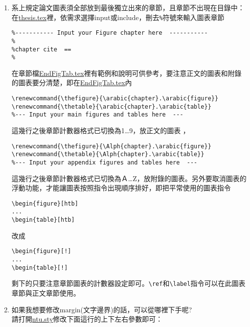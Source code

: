 \begin{enumerate}[leftmargin=0pt, topsep=0pt, itemsep=0pt, label=\Roman{*}.]
\begin{enumerate}[topsep=0pt, itemsep=0pt, label=$\bullet$]
\begin{verbatim}
\chapter{First appendix title}
    \end{verbatim}
    即可，以此類推。    
        \item 系上規定論文圖表須全部放到最後獨立出來的章節，且章節不出現在目錄中：\\
    在\href{run:./thesis.tex}{thesis.tex}裡，依需求選擇input或include，刪去\texttt{\%}符號來輸入圖表章節
    \begin{verbatim}    
%----------- Input your Figure chapter here  -----------
% 
%chapter cite  == 
%
    \end{verbatim}
    在章節檔\href{run:./EndFigTab.tex}{EndFigTab.tex}裡有範例和說明可供參考，要注意正文的圖表和附錄的圖表要分清楚，即在\href{run:./EndFigTab.tex}{EndFigTab.tex}內
    \begin{verbatim}    
\renewcommand{\thefigure}{\arabic{chapter}.\arabic{figure}} 
\renewcommand{\thetable}{\arabic{chapter}.\arabic{table}} 
%--- Input your main figures and tables here  ---
    \end{verbatim}
    這幾行之後章節計數器格式已切換為1\dots 9，放正文的圖表 ，
     \begin{verbatim}    
\renewcommand{\thefigure}{\Alph{chapter}.\arabic{figure}} 
\renewcommand{\thetable}{\Alph{chapter}.\arabic{table}}
%--- Input your appendix figures and tables here  ---
    \end{verbatim}
    這幾行之後章節計數器格式已切換為Ａ\dots Z，放附錄的圖表。另外要取消圖表的浮動功能，才能讓圖表按照指令出現順序排好，即把平常使用的圖表指令
    \begin{verbatim}    
\begin{figure}[htb]
...
\begin{table}[htb]
    \end{verbatim}
    改成
     \begin{verbatim}    
\begin{figure}[!]
...
\begin{table}[!]
    \end{verbatim}
    剩下的只要注意章節圖表的計數器設定即可。\texttt{\textbackslash ref}和\texttt{\textbackslash label}指令可以在此圖表章節與正文章節使用。
     \item 如果我想要修改margin(文字邊界)的話，可以從哪裡下手呢?\\
     請打開\href{run:./ntu.sty}{ntu.sty}修改下面這行的上下左右參數即可：

\end{enumerate}
\end{enumerate}
